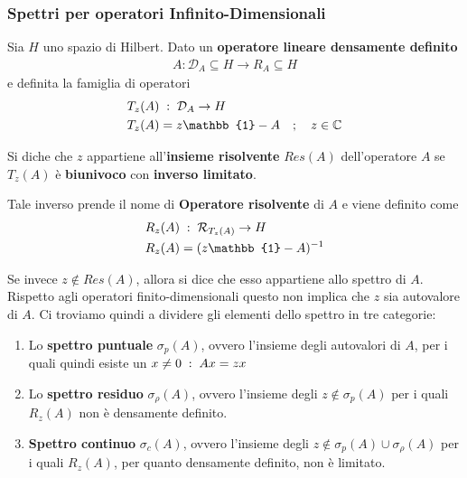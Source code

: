 \newpage

\subsubsection{Spettri per operatori Infinito-Dimensionali}

Sia $H$ uno spazio di Hilbert. Dato un \textbf{operatore lineare densamente definito}
\begin{align}
	A : \mathcal{D}_A \subseteq H \rightarrow R_A \subseteq H
\end{align} 
e definita la famiglia di operatori
\begin{align}
	&T_z(A) \taleche \mathcal{D}_A \rightarrow H\\
	&T_z(A) = z\mathbb{1} - A \spacer z \in \C
\end{align}


Si diche che $z$ appartiene all'\textbf{insieme risolvente} $Res(A)$ dell'operatore $A$ se $T_z (A)$ è \textbf{biunivoco} con \textbf{inverso limitato}.

Tale inverso prende il nome di \textbf{Operatore risolvente} di $A$ e viene definito come
\begin{align}
	&R_z(A) \taleche \mathcal{R}_{T_z(A)} \rightarrow H\\
	&R_z(A) = (z\mathbb{1} - A)^{-1}
\end{align}

Se invece $z \notin Res(A)$, allora si dice che esso appartiene allo spettro di $A$.
Rispetto agli operatori finito-dimensionali questo non implica che $z$ sia autovalore di $A$. Ci troviamo quindi a dividere gli elementi dello spettro in tre categorie:
\begin{enumerate}
	\item Lo \textbf{spettro puntuale} $\sigma_p(A)$, ovvero l'insieme degli autovalori di $A$, per i quali quindi esiste un $x \neq 0 \; : \; Ax = zx$
	
	\item Lo \textbf{spettro residuo} $\sigma_\rho(A)$, ovvero l'insieme degli $z\notin \sigma_p(A)$ per i quali $R_z(A)$ non è densamente definito.
	
	\item \textbf{Spettro continuo} $\sigma_c(A)$, ovvero l'insieme degli $z\notin \sigma_p(A) \cup \sigma_\rho (A)$  per i quali $R_z(A)$, per quanto densamente definito, non è limitato.
\end{enumerate}




\newpage
